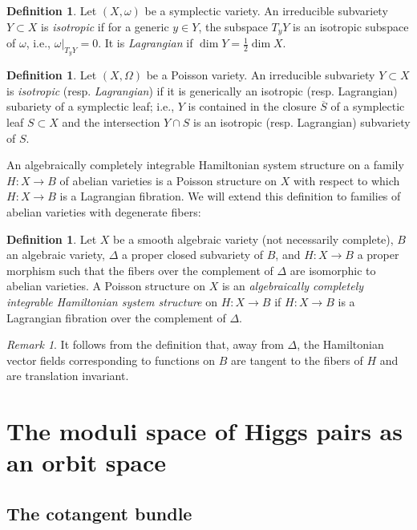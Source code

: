 \documentclass[12pt,a4paper,oneside,english]{smfart}
\theoremstyle{definition}
\newtheorem{defn}[thm]{Definition}
\theoremstyle{remark}
\newtheorem{rem}[thm]{Remark}
\begin{document}
\begin{defn}\label{t5.9}
Let $(X, \omega)$ be a symplectic variety. An irreducible subvariety $Y \subset X$ is \emph{isotropic} if for a generic $y \in Y$, the subspace $T_y Y$ is an isotropic subspace of $\omega$, i.e., $\omega|_{T_y Y} = 0$. It is \emph{Lagrangian} if $\dim Y = \frac{1}{2}\dim X$.
\end{defn}

\begin{defn}\label{t5.10}
Let $(X, \Omega)$ be a Poisson variety. An irreducible subvariety $Y \subset X$ is \emph{isotropic} (resp. \emph{Lagrangian}) if it is generically an isotropic (resp. Lagrangian) subariety of a symplectic leaf; i.e., $Y$ is contained in the closure $\overline{S}$ of a symplectic leaf $S \subset X$ and the intersection $Y \cap S$ is an isotropic (resp. Lagrangian) subvariety of $S$.
\end{defn}

An algebraically completely integrable Hamiltonian system structure on a family $H \colon X \to B$ of abelian varieties is a Poisson structure on $X$ with respect to which $H \colon X \to B$ is a Lagrangian fibration. We will extend this definition to families of abelian varieties with degenerate fibers:

\begin{defn}\label{t5.11}
Let $X$ be a smooth algebraic variety (not necessarily complete), $B$ an algebraic variety, $\Delta$ a proper closed subvariety of $B$, and $H \colon X \to B$ a proper morphism such that the fibers over the complement of $\Delta$ are isomorphic to abelian varieties. A Poisson structure on $X$ is an \emph{algebraically completely integrable Hamiltonian system structure} on $H \colon X \to B$ if $H \colon X \to B$ is a Lagrangian fibration over the complement of $\Delta$.
\end{defn}

\begin{rem}\label{t5.12}
It follows from the definition that, away from $\Delta$, the Hamiltonian vector fields corresponding to functions on $B$ are tangent to the fibers of $H$ and are translation invariant.
\end{rem}

\section{The moduli space of Higgs pairs as an orbit space}\label{sec:6}

\subsection{The cotangent bundle}\label{sec:6.1}
\end{document}
